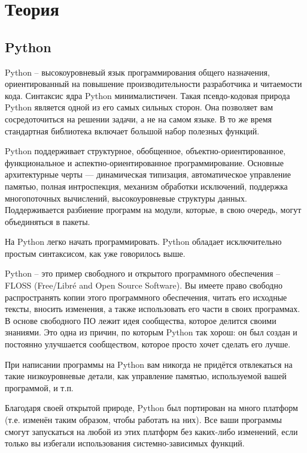 \documentclass[11pt,a4paper]{report}
\begin{document}
\tableofcontents
\newpage
\section{Теория}
\subsection{Python}

Python – высокоуровневый язык программирования общего назначения, ориентированный на повышение производительности разработчика и читаемости кода. Синтаксис ядра Python минималистичен. Такая псевдо-кодовая природа Python является одной из его самых сильных сторон. Она позволяет вам сосредоточиться на решении задачи, а не на самом языке. В то же время стандартная библиотека включает большой набор полезных функций.

Python поддерживает структурное, обобщенное, объектно-ориентированное, функциональное и аспектно-ориентированное программирование. Основные архитектурные черты — динамическая типизация, автоматическое управление памятью, полная интроспекция, механизм обработки исключений, поддержка многопоточных вычислений, высокоуровневые структуры данных. Поддерживается разбиение программ на модули, которые, в свою очередь, могут объединяться в пакеты.

На Python легко начать программировать. Python обладает исключительно простым синтаксисом, как уже говорилось выше.

Python – это пример свободного и открытого программного обеспечения –FLOSS (Free/Libré and Open Source Software). Вы имеете право свободно распространять копии этого программного обеспечения, читать его исходные тексты, вносить изменения, а также использовать его части в своих программах. В основе свободного ПО лежит идея сообщества, которое делится своими знаниями. Это одна из причин, по которым Python так хорош: он был создан и постоянно улучшается сообществом, которое просто хочет сделать его лучше.

При написании программы на Python вам никогда не придётся отвлекаться на такие низкоуровневые детали, как управление памятью, используемой вашей программой, и т.п.

Благодаря своей открытой природе, Python был портирован на много платформ (т.е. изменён таким образом, чтобы работать на них). Все ваши программы смогут запускаться на любой из этих платформ без каких-либо изменений, если только вы избегали использования системно-зависимых функций.
\end{document}
